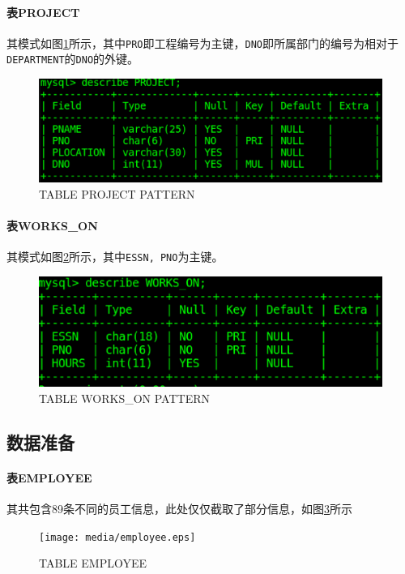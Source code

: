 \documentclass{ML}
\begin{document}
\paragraph{表PROJECT} 其模式如图\ref{fig:pro_pattern}所示，其中\texttt{PRO}即工程编号为主键，\texttt{DNO}即所属部门的编号为相对于\texttt{DEPARTMENT}的\texttt{DNO}的外键。
\begin{figure}[htb]
    \centering
    \includegraphics[scale = 0.5, bb=0 0 645 236]{media/project_pattern.eps}
    \caption{TABLE PROJECT PATTERN}\label{fig:pro_pattern}
\end{figure}
\paragraph{表WORKS\_ON} 其模式如图\ref{fig:works_pattern}所示，其中\texttt{ESSN, PNO}为主键。
\begin{figure}[htb]
    \centering
    \includegraphics[scale = 0.5, bb=0 0 566 181]{media/works_on_pattern.eps}
    \caption{TABLE WORKS\_ON PATTERN}\label{fig:works_pattern}
\end{figure}
\subsection{数据准备}
\paragraph{表EMPLOYEE} 其共包含89条不同的员工信息，此处仅仅截取了部分信息，如图\ref{fig:employee}所示
\begin{figure}[htb]
    \centering
    \texttt{[image: media/employee.eps]}
    \caption{TABLE EMPLOYEE}\label{fig:employee}
\end{figure}
\end{document}
